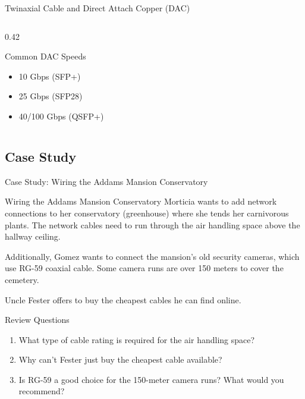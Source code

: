 \documentclass[aspectratio=169]{beamer}  %
\begin{document}
\begin{frame}{Twinaxial Cable and Direct Attach Copper (DAC)}
\begin{columns}[T]
\begin{column}{0.42\textwidth}
            \vspace{0.5em}
            \begin{block}{Common DAC Speeds}
                \begin{itemize}
                    \scriptsize
                    \item 10 Gbps (SFP+)
                    \item 25 Gbps (SFP28)
                    \item 40/100 Gbps (QSFP+)
                \end{itemize}
            \end{block}
        \end{column}
    \end{columns}
\end{frame}

\subsection{Case Study}

\begin{frame}{Case Study: Wiring the Addams Mansion Conservatory}
    \begin{casestudy}{Wiring the Addams Mansion Conservatory}
        Morticia wants to add network connections to her conservatory (greenhouse) where she tends her carnivorous plants. The network cables need to run through the air handling space above the hallway ceiling.
        
        \vspace{0.5em}
        Additionally, Gomez wants to connect the mansion's old security cameras, which use RG-59 coaxial cable. Some camera runs are over 150 meters to cover the cemetery.
        
        \vspace{0.5em}
        Uncle Fester offers to buy the cheapest cables he can find online.
    \end{casestudy}
    
    \begin{block}{Review Questions}
        \begin{enumerate}
            \item What type of cable rating is required for the air handling space?
            \item Why can't Fester just buy the cheapest cable available?
            \item Is RG-59 a good choice for the 150-meter camera runs? What would you recommend?
        \end{enumerate}
    \end{block}
\end{frame}
\end{document}
